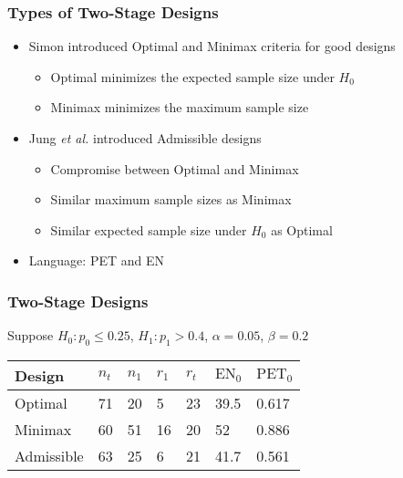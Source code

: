 \documentclass{beamer}\usepackage[]{graphicx}\usepackage[]{color}
\begin{document}
\begin{frame}
\frametitle{Types of Two-Stage Designs}
    \begin{itemize}
        \item Simon introduced Optimal and Minimax criteria for good designs
          \begin{itemize}
             \item Optimal minimizes the expected sample size under $H_0$
             \item Minimax minimizes the maximum sample size 
          \end{itemize}
        \item Jung \textit{et al.} introduced Admissible designs
            \begin{itemize}
              \item Compromise between Optimal and Minimax
              \item Similar maximum sample sizes as Minimax
              \item Similar expected sample size under $H_0$ as Optimal
            \end{itemize}
        \item Language: PET and EN
    \end{itemize}
\end{frame}

\begin{frame}
\frametitle{Two-Stage Designs}
 Suppose $H_0: p_0 \leq 0.25$, $H_1: p_1 > 0.4$, $\alpha = 0.05$, $\beta = 0.2$

\begin{table}[]
\centering
\begin{tabular}{l|llllll}
Design     & $n_t$ & $n_1$ & $r_1$ & $r_t$ & $\mbox{EN}_0$    & $\mbox{PET}_0$ \\ \hline
Optimal    & 71      &  20     &   5    &   23    &      39.5      &    0.617            \\
Minimax    &  60     &  51     &   16    &   20    &    52          &      0.886          \\
Admissible &  63     &   25    &   6    &   21    &     41.7     &     0.561          
\end{tabular}
\end{table}
\end{frame}

\end{document}
